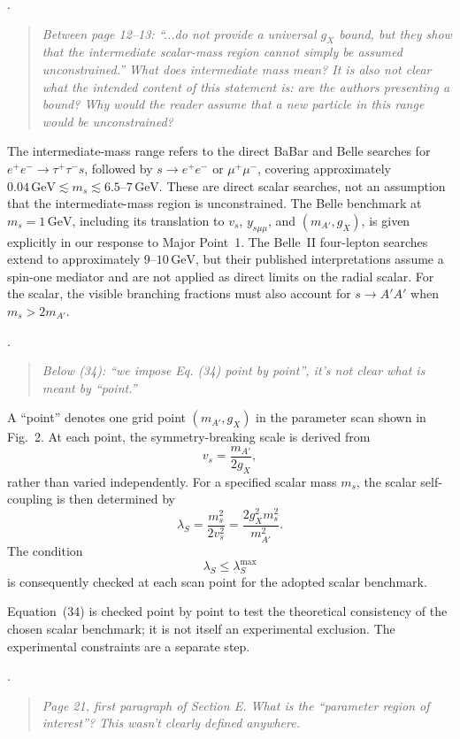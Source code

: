 \documentclass[12pt,a4paper]{article}
\begin{document}
\medskip
{}. \begin{quote}\itshape
Between page 12--13: ``...do not provide a universal \(g_X\) bound, but they show that the intermediate scalar-mass region cannot simply be assumed unconstrained.'' What does intermediate mass mean? It is also not clear what the intended content of this statement is: are the authors presenting a bound? Why would the reader assume that a new particle in this range would be unconstrained?
\end{quote}

The intermediate-mass range refers to the direct BaBar and Belle searches for \(e^+e^-\to\tau^+\tau^-s\), followed by \(s\to e^+e^-\) or \(\mu^+\mu^-\), covering approximately \(0.04\,\mathrm{GeV}\lesssim m_s\lesssim6.5\text{--}7\,\mathrm{GeV}\). These are direct scalar searches, not an assumption that the intermediate-mass region is unconstrained. The Belle benchmark at \(m_s=1\,\mathrm{GeV}\), including its translation to \(v_s\), \(y_{s\mu\mu}\), and \((m_{A'},g_X)\), is given explicitly in our response to Major Point~1. The Belle~II four-lepton searches extend to approximately \(9\text{--}10\,\mathrm{GeV}\), but their published interpretations assume a spin-one mediator and are not applied as direct limits on the radial scalar. For the scalar, the visible branching fractions must also account for \(s\to A'A'\) when \(m_s>2m_{A'}\).

\medskip
{}. \begin{quote}\itshape
Below (34): ``we impose Eq. (34) point by point'', it's not clear what is meant by ``point.''
\end{quote}

A ``point'' denotes one grid point \((m_{A'},g_X)\) in the parameter scan shown in Fig.~2. At each point, the symmetry-breaking scale is derived from
\[
v_s=\frac{m_{A'}}{2g_X},
\]
rather than varied independently. For a specified scalar mass \(m_s\), the scalar self-coupling is then determined by
\[
\lambda_S
=\frac{m_s^2}{2v_s^2}
=\frac{2g_X^2m_s^2}{m_{A'}^2}.
\]
The condition
\[
\lambda_S\leq\lambda_S^{\max}
\]
is consequently checked at each scan point for the adopted scalar benchmark.

Equation~(34) is checked point by point to test the theoretical consistency of the chosen scalar benchmark; it is not itself an experimental exclusion. The experimental constraints are a separate step.

\medskip
{}. \begin{quote}\itshape
Page 21, first paragraph of Section E. What is the ``parameter region of interest''? This wasn't clearly defined anywhere.
\end{quote}
\end{document}
